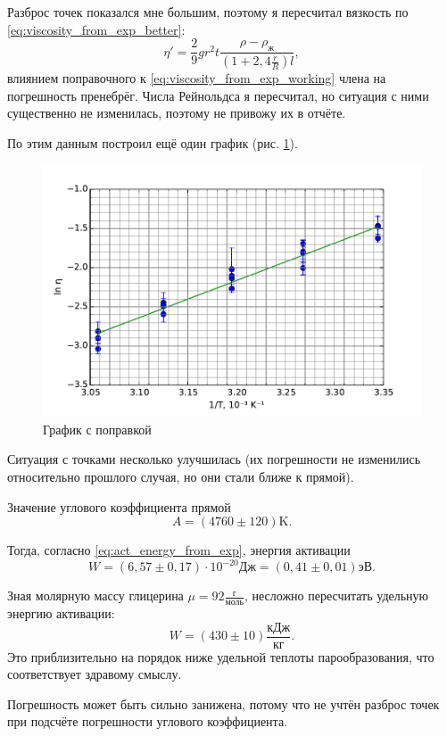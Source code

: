 \documentclass[12pt]{article}
\begin{document}
	Разброс точек показался мне большим, поэтому я пересчитал вязкость по \eqref{eq:viscosity_from_exp_better}:
	\begin{equation}
	\label{eq:viscosity_from_exp_better_working}
	\eta'=\frac{2}{9} gr^2 t \frac{\rho -\rho_\text{ж}}{\left( 1 + 2{,}4 \frac{r}{R} \right) l},
	\end{equation}
	влиянием поправочного к \eqref{eq:viscosity_from_exp_working} члена на погрешность пренебрёг. Числа Рейнольдса я пересчитал, но ситуация с ними существенно не изменилась, поэтому не привожу их в отчёте.
	
	По этим данным построил ещё один график (рис. \ref{fig:graph1}).
	
	\begin{figure}[h!]
	\caption{График с поправкой}
	\label{fig:graph1}
	\begin{center}
	\includegraphics[scale=1]{graph1.pdf}
	\end{center}
	\end{figure}
	
	Ситуация с точками несколько улучшилась (их погрешности не изменились относительно прошлого случая, но они стали ближе к прямой).
	
	Значение углового коэффициента прямой
	\begin{equation}
	\label{eq:angle_coeff}
	A = \left( 4760\pm 120 \right) \text{K}.
	\end{equation}
	
	Тогда, согласно \eqref{eq:act_energy_from_exp}, энергия активации
	\begin{equation}
	\label{eq:act_energy_res}
	W = \left( 6{,}57\pm 0{,}17 \right) \cdot 10^{-20} \text{Дж} = \left( 0{,}41\pm 0{,}01 \right) \text{эВ}.
	\end{equation}
	
	Зная молярную массу глицерина $\mu=92\frac{\text{г}}{\text{моль}}$, несложно пересчитать удельную энергию активации:
	\begin{equation}
	\label{eq:act_energy_by_mass}
	W = \left( 430\pm 10 \right) \frac{\text{кДж}}{\text{кг}}.
	\end{equation}
	Это приблизительно на порядок ниже удельной теплоты парообразования, что соответствует здравому смыслу.
	
	Погрешность может быть сильно занижена, потому что не учтён разброс точек при подсчёте погрешности углового коэффициента.
	
\end{document}
